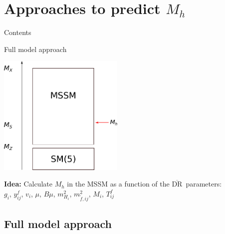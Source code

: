 \documentclass[hyperref={pdfpagelabels=false},ngerman]{beamer}
\renewcommand{\emph}{\textbf}
\newcommand{\DRbar}{\ensuremath{\overline{\text{DR}}}}
\begin{document}

\section{Approaches to predict $M_h$}

\begin{frame}{Contents}
  \tableofcontents[currentsection]  
\end{frame}


\begin{frame}{Full model approach}
  \begin{center}
    \includegraphics[width=0.45\textwidth]{images/mssm-sm-tower-diagrammatic}\\[1em]
  \end{center}
  \emph{Idea:} Calculate $M_h$ in the MSSM as a function of the \DRbar\ parameters:\\[1em]
  \centering $g_i$, $y^f_{ij}$, $v_i$, $\mu$, $B\mu$, $m^2_{H_i}$,
  $m_{\tilde{f},ij}^2$, $M_i$, $T^f_{ij}$
\end{frame}

\subsection{Full model approach}
\end{document}
